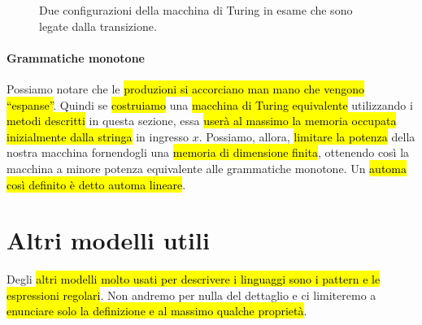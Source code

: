 \documentclass[a4paper,11pt,twoside]{article}
\theoremstyle{plain}
\theoremstyle{definition}
\theoremstyle{remark}
\begin{document}
\begin{figure}[htb]
  \centering
  \caption{Due configurazioni della macchina di Turing in esame che sono legate
  dalla transizione.}\label{fig:grammatica-mt-stati}
\end{figure}

\paragraph{Grammatiche monotone} Possiamo notare che le \hl{produzioni si
accorciano man mano che vengono ``espanse''}. Quindi se \hl{costruiamo} una
\hl{macchina di Turing equivalente} utilizzando i \hl{metodi descritti} in
questa sezione, essa \hl{userà al massimo la memoria occupata inizialmente dalla
stringa} in ingresso $x$. Possiamo, allora, \hl{limitare la potenza} della
nostra macchina fornendogli una \hl{memoria di dimensione finita}, ottenendo
così la macchina a minore potenza equivalente alle grammatiche monotone. Un
\hl{automa così definito è detto automa lineare}.

\section{Altri modelli utili}\label{sec:altri-modelli}

Degli \hl{altri modelli molto usati per descrivere i linguaggi sono i pattern e
le espressioni regolari}. Non andremo per nulla del dettaglio e ci limiteremo a
\hl{enunciare solo la definizione e al massimo qualche proprietà}.
\end{document}

